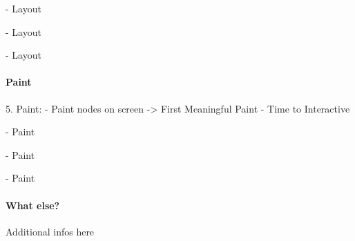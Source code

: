 - Layout


- Layout


- Layout









\paragraph{Paint}




5. Paint:
- Paint nodes on screen
-> First Meaningful Paint
- Time to Interactive


- Paint



- Paint


- Paint








\paragraph{What else?}

Additional infos here







